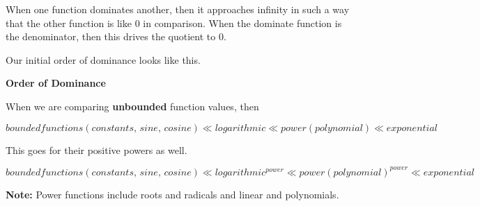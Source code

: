 \documentclass{ximera}
\begin{document}
When one function dominates another, then it approaches infinity in such a way that the other function is like $0$ in comparison. When the dominate function is the denominator, then this drives the quotient to $0$.


Our initial order of dominance looks like this. 


\begin{summary} \textbf{\textcolor{red!70!yellow}{Order of Dominance}}


When we are comparing \textbf{unbounded} function values, then 

\[   bounded functions (constants, \, sine, \, cosine)  \ll logarithmic \ll power (polynomial) \ll  exponential  \]



This goes for their positive powers as well. 


\[   bounded functions (constants, \, sine, \, cosine)  \ll logarithmic^{power} \ll power (polynomial)^{power} \ll  exponential  \]



\end{summary}

\textbf{Note:} Power functions include roots and radicals and linear and polynomials.
\end{document}
